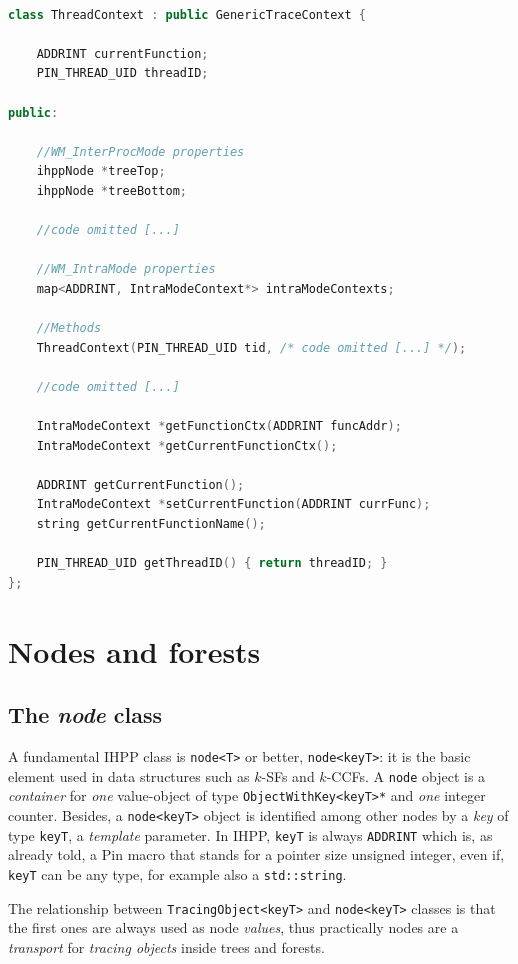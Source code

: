 \documentclass[a4paper,10pt]{report}
\begin{document}
\begin{lstlisting}[language=C++, 
	caption={partial definition of \texttt{ThreadContext} class}, 
	label=threadCtx, frame=leftline]

class ThreadContext : public GenericTraceContext {

	ADDRINT currentFunction;
	PIN_THREAD_UID threadID;

public:
	
	//WM_InterProcMode properties
	ihppNode *treeTop;
	ihppNode *treeBottom;

	//code omitted [...]

	//WM_IntraMode properties
	map<ADDRINT, IntraModeContext*> intraModeContexts;

	//Methods
	ThreadContext(PIN_THREAD_UID tid, /* code omitted [...] */);

	//code omitted [...]

	IntraModeContext *getFunctionCtx(ADDRINT funcAddr);
	IntraModeContext *getCurrentFunctionCtx();

	ADDRINT getCurrentFunction();
	IntraModeContext *setCurrentFunction(ADDRINT currFunc);
	string getCurrentFunctionName(); 

	PIN_THREAD_UID getThreadID() { return threadID; }
};

\end{lstlisting}

\section{Nodes and forests}

\subsection{The \emph{node} class}

A fundamental IHPP class is \verb|node<T>| or better, \verb|node<keyT>|:
it is the basic element used in data structures such as $k$-SFs and $k$-CCFs.
A \verb|node| object is a \emph{container} for \emph{one}
value-object of type \verb|ObjectWithKey<keyT>*| and \emph{one} integer counter. 
Besides, a \verb|node<keyT>| object is identified among other nodes by a
\emph{key} of type \verb|keyT|, a \emph{template} parameter. 
In IHPP, \verb|keyT| is always \verb|ADDRINT| which is, as already told, a Pin macro
that stands for a pointer size unsigned integer, even if, \verb|keyT| can be 
any type, for example also a \verb|std::string|.

The relationship between \verb|TracingObject<keyT>| and \verb|node<keyT>| classes is
that the first ones are always used as node \emph{values}, thus practically 
nodes are a \emph{transport} for \emph{tracing objects} inside trees and forests.
\end{document}
